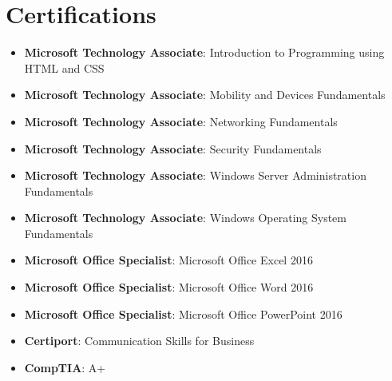 \documentclass[letterpaper,11pt]{article}
\newcommand{\resumeItem}[2]{
  \item\small{
    \textbf{#1}{: #2 \vspace{-2pt}}
  }
}
\newcommand{\resumeSubItem}[2]{\resumeItem{#1}{#2}\vspace{-4pt}}
\newcommand{\resumeSubHeadingListStart}{\begin{itemize}[leftmargin=*]}
\newcommand{\resumeSubHeadingListEnd}{\end{itemize}}
\begin{document}
\section{Certifications}
\resumeSubHeadingListStart
\resumeSubItem{Microsoft Technology Associate}
{Introduction to Programming using HTML and CSS}
\resumeSubItem{Microsoft Technology Associate}
{Mobility and Devices Fundamentals}
\resumeSubItem{Microsoft Technology Associate}
{Networking Fundamentals}
\resumeSubItem{Microsoft Technology Associate}
{Security Fundamentals}
\resumeSubItem{Microsoft Technology Associate}
{Windows Server Administration Fundamentals}
\resumeSubItem{Microsoft Technology Associate}
{Windows Operating System Fundamentals}
\resumeSubItem{Microsoft Office Specialist}
{Microsoft Office Excel 2016}
\resumeSubItem{Microsoft Office Specialist}
{Microsoft Office Word 2016}
\resumeSubItem{Microsoft Office Specialist}
{Microsoft Office PowerPoint 2016}
\resumeSubItem{Certiport}
{Communication Skills for Business}
\resumeSubItem{CompTIA}
{A+}
\resumeSubHeadingListEnd


\end{document}
